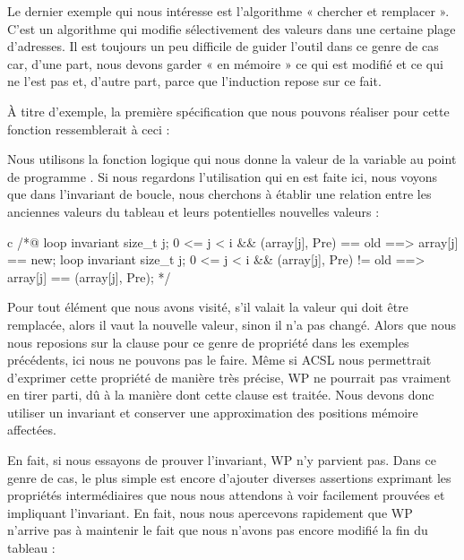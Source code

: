 \label{l4:statements-loops-ex-search-and-replace}


Le dernier exemple qui nous intéresse est l'algorithme « chercher et remplacer ».
C'est un algorithme qui modifie sélectivement des valeurs dans une
certaine plage d'adresses. Il est toujours un peu difficile de guider l'outil
dans ce genre de cas car, d'une part, nous devons garder « en mémoire » ce qui est modifié
et ce qui ne l'est pas et, d'autre part, parce que l'induction repose sur ce fait.



À titre d'exemple, la première spécification que nous pouvons réaliser pour
cette fonction ressemblerait à ceci :






Nous utilisons la fonction logique  qui nous donne la valeur de
la variable  au point de programme . Si nous regardons l'utilisation qui
en est faite ici, nous voyons que dans l'invariant de boucle, nous cherchons à
établir une relation entre les anciennes valeurs du tableau et leurs potentielles
nouvelles valeurs :



\begin{CodeBlock}{c}
/*@
  loop invariant \forall size_t j; 0 <= j < i && \at(array[j], Pre) == old
                   ==> array[j] == new;
  loop invariant \forall size_t j; 0 <= j < i && \at(array[j], Pre) != old
                   ==> array[j] == \at(array[j], Pre);
*/
\end{CodeBlock}


Pour tout élément que nous avons visité, s'il valait la valeur qui doit être
remplacée, alors il vaut la nouvelle valeur, sinon il n'a pas changé. Alors que
nous nous reposions sur la clause  pour ce genre de propriété
dans les exemples précédents, ici nous ne pouvons pas le faire. Même si ACSL nous
permettrait d'exprimer cette propriété de manière très précise, WP ne pourrait pas
vraiment en tirer parti, dû à la manière dont cette clause est traitée. Nous devons
donc utiliser un invariant et conserver une approximation des positions mémoire
affectées.


En fait, si nous essayons de prouver l'invariant, WP n'y parvient pas. Dans ce genre de
cas, le plus simple est encore d'ajouter diverses assertions exprimant les
propriétés intermédiaires que nous nous attendons à voir facilement prouvées
et impliquant l'invariant. En fait, nous nous apercevons rapidement que WP
n'arrive pas à maintenir le fait que nous n'avons pas encore modifié la fin du
tableau :



